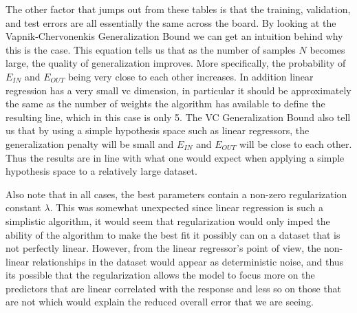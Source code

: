 \documentclass[runningheads]{llncs}
\begin{document}
The other factor that jumps out from these tables is that the training, validation, and test errors are all essentially the same across the board. By looking at the Vapnik-Chervonenkis Generalization Bound we can get an intuition behind why this is the case. This equation tells us that as the number of samples $N$ becomes large, the quality of generalization improves. More specifically, the probability of $E_{IN}$ and $E_{OUT}$ being very close to each other increases. In addition linear regression has a very small vc dimension, in particular it should be approximately the same as the number of weights the algorithm has available to define the resulting line, which in this case is only 5. The VC Generalization Bound also tell us that by using a simple hypothesis space such as linear regressors, the generalization penalty will be small and $E_{IN}$ and $E_{OUT}$ will be close to each other. Thus the results are in line with what one would expect when applying a simple hypothesis space to a relatively large dataset.

Also note that in all cases, the best parameters contain a non-zero regularization constant $\lambda$. This was somewhat unexpected since linear regression is such a simplistic algorithm, it would seem that regularization would only imped the ability of the algorithm to make the best fit it possibly can on a dataset that is not perfectly linear. However, from the linear regressor's point of view, the non-linear relationships in the dataset would appear as deterministic noise, and thus its possible that the regularization allows the model to focus more on the predictors that are linear correlated with the response and less so on those that are not which would explain the reduced overall error that we are seeing.
\end{document}
